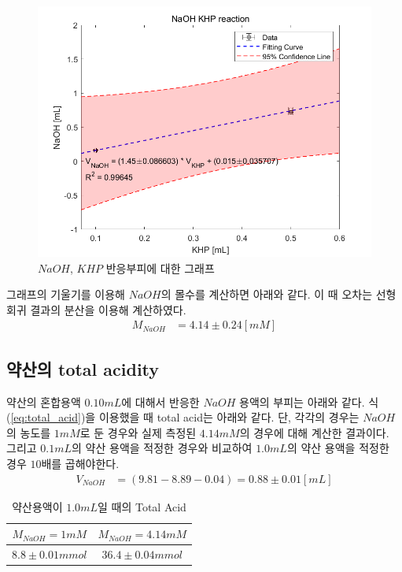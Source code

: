 \documentclass[%
 reprint,
 amsmath,amssymb,
 aps,
]{revtex4-2}
\begin{document}
\begin{figure}[htbp]
	\includegraphics[width = 0.95\linewidth]{NaOH_KHP.png}%
	\caption{\label{fig:NaOH_KHP}$NaOH$, $KHP$ 반응부피에 대한 그래프}
\end{figure}
그래프의 기울기를 이용해 $NaOH$의 몰수를 계산하면 아래와 같다. 이 때 오차는 선형회귀 결과의 분산을 이용해 계산하였다.
\begin{align}
	M_{NaOH} &= 4.14 \pm 0.24 [mM]
\end{align}


\subsection{\label{sec:level2}약산의 total acidity}
약산의 혼합용액 $0.10mL$에 대해서 반응한 $NaOH$ 용액의 부피는 아래와 같다. 식 (\ref{eq:total_acid})을 이용했을 때 total acid는 아래와 같다. 단, 각각의 경우는 $NaOH$의 농도를 $1mM$로 둔 경우와 실제 측정된 $4.14mM$의 경우에 대해 계산한 결과이다. 그리고 $0.1mL$의 약산 용액을 적정한 경우와 비교하여 $1.0mL$의 약산 용액을 적정한 경우 $10$배를 곱해야한다.
\begin{align}
	V_{NaOH} &= (9.81 - 8.89 -0.04) = 0.88 \pm 0.01 [mL]
\end{align}

\begin{table}[]
\begin{tabular}{c|c} \hline \hline
$M_{NaOH} = 1mM$ & $M_{NaOH} = 4.14mM$ \\ \hline
$8.8\pm0.01mmol$ & $36.4\pm0.04mmol$  \\ \hline \hline
\end{tabular}
\caption{\label{tab:total acid}약산용액이 $1.0mL$일 때의 Total Acid}
\end{table}
\end{document}
